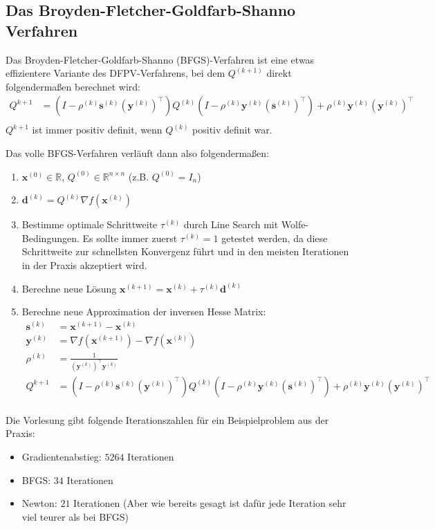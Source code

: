\documentclass{report}
\newcommand{\xk}{\bm{x}^{(k)}}
\newcommand{\yk}{\bm{y}^{(k)}}
\newcommand{\dk}{\bm{d}^{(k)}}
\newcommand{\sk}{\bm{s}^{(k)}}
\newcommand{\tauk}{\tau^{(k)}}
\newcommand{\rhok}{\rho^{(k)}}
\newcommand{\Qk}{Q^{(k)}}
\newcommand*{\newpar}{\par\vspace{\baselineskip}\noindent}
\begin{document}
\subsection{Das Broyden-Fletcher-Goldfarb-Shanno Verfahren}
Das Broyden-Fletcher-Goldfarb-Shanno (BFGS)-Verfahren ist eine etwas effizientere Variante des DFPV-Verfahrens, bei dem $Q^{(k+1)}$ direkt folgendermaßen berechnet wird:
\begin{align*}
 Q^{k+1} &= (I - \rhok \sk (\yk)^\top) \Qk (I - \rhok \yk (\sk)^\top) + \rhok \yk (\yk)^\top\\
\end{align*}
$Q^{k+1}$ ist immer positiv definit, wenn $Q^{(k)}$ positiv definit war.
\newpar
Das volle BFGS-Verfahren verläuft dann also folgendermaßen:
\begin{enumerate}
 \item $\bm{x}^{(0)} \in \mathbb{R}$, $Q^{(0)} \in \mathbb{R}^{n \times n}$ (z.B. $Q^{(0)} = I_n$)
 \item $\dk = \Qk \nabla f(\xk)$
 \item Bestimme optimale Schrittweite $\tauk$ durch Line Search mit Wolfe-Bedingungen. Es sollte immer zuerst $\tauk = 1$ getestet werden, da diese Schrittweite zur schnellsten Konvergenz führt und in den meisten Iterationen in der Praxis akzeptiert wird.
 \item Berechne neue Lösung $\bm{x}^{(k+1)} = \xk + \tauk \dk$
 \item Berechne neue Approximation der inversen Hesse Matrix:
 \begin{align*}
  \sk &= \bm{x}^{(k+1)} - \xk\\
  \yk &= \nabla f(\bm{x}^{(k+1)}) - \nabla f(\xk)\\
  \rhok &= \frac{1}{(\yk)^\top \yk}\\
  Q^{k+1} &= (I - \rhok \sk (\yk)^\top) \Qk (I - \rhok \yk (\sk)^\top) + \rhok \yk (\yk)^\top\\
 \end{align*}
\end{enumerate}
Die Vorlesung gibt folgende Iterationszahlen für ein Beispielproblem aus der Praxis:
\begin{itemize}
 \item Gradientenabstieg: $5264$ Iterationen
 \item BFGS: $34$ Iterationen
 \item Newton: $21$ Iterationen (Aber wie bereits gesagt ist dafür jede Iteration sehr viel teurer als bei BFGS)
\end{itemize}
\end{document}
